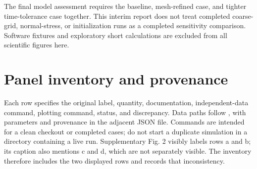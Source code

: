 \documentclass[11pt]{article}
\newcommand{\code}[1]{\texttt{\detokenize{#1}}}
\begin{document}
The final model assessment requires the baseline, mesh-refined case, and tighter
time-tolerance case together. This interim report does not treat completed
coarse-grid, normal-stress, or initialization runs as a completed sensitivity
comparison. Software fixtures and exploratory short calculations are excluded
from all scientific figures here.

\section{Panel inventory and provenance}
Each row specifies the original label, quantity, documentation, independent-data
command, plotting command, status, and discrepancy. Data paths follow
\code{data/panels/<label>.npz}, with parameters and provenance in the adjacent
JSON file. Commands are intended for a clean checkout or completed cases; do not
start a duplicate simulation in a directory containing a live run.
Supplementary Fig. 2 visibly labels rows a and b; its caption also mentions c
and d, which are not separately visible. The inventory therefore includes the
two displayed rows and records that inconsistency.
\end{document}
